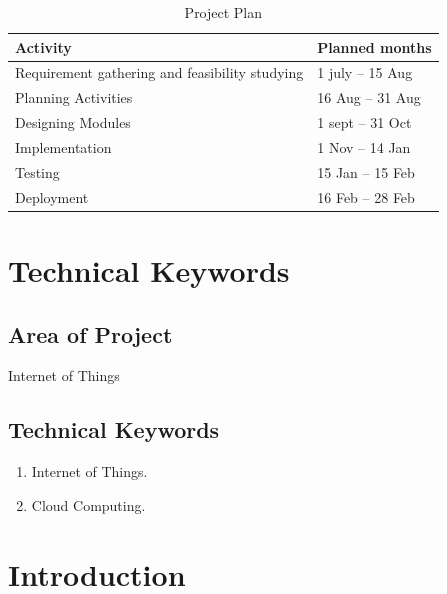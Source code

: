 \documentclass[oneside,a4paper,12pt]{report}
\begin{document}
\begin{table}[!htbp]
\begin{center}
\def\arraystretch{1.5}
\begin{tabularx}{\textwidth}{| X | X |}
\hline
Activity	& Planned months\\
\hline
Requirement gathering and feasibility studying        &1 july – 15 Aug\\
\hline
Planning Activities       &16 Aug – 31 Aug\\
\hline
Designing Modules        &1 sept – 31 Oct\\
\hline
Implementation           &1 Nov – 14 Jan\\
\hline
Testing                  &15 Jan – 15 Feb\\
\hline
Deployment               &16 Feb – 28 Feb\\
\hline



\end{tabularx}
\end{center}
\caption{Project Plan}
\label{tab:usecase}
\end{table}

\chapter{Technical Keywords}
\section{Area of Project}
Internet of Things
\section{Technical Keywords}

\begin{enumerate}
	 
\item Internet of Things.
\item Cloud Computing.

\end{enumerate}

			
\chapter{Introduction}
\end{document}
